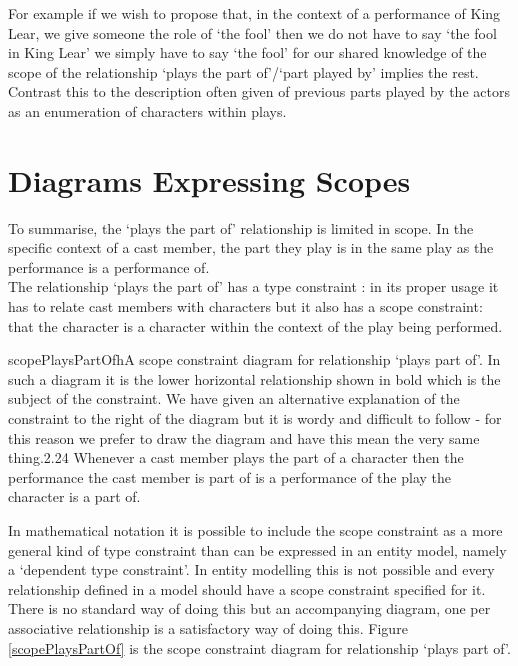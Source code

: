 \noindent For example if we wish to propose that, in the context of a performance of King Lear, we  give someone the role of `the fool' then we do not have to say `the fool in King Lear' we simply have to say `the fool' for our shared knowledge of the scope of the relationship `plays the part of'/`part played by' implies the rest. Contrast this to the description often given of previous parts played by the actors as an enumeration of characters within plays.\\

\section{Diagrams Expressing Scopes}
\noindent To summarise, the `plays the part of' relationship is limited in scope. In the specific context of a cast member, the part they play is in the same play as the performance is a performance of. \\

\noindent The relationship `plays the part of' has a type constraint : in its proper usage it has to relate cast members with characters but it also has a scope constraint: that the character is a character within the context of the play being performed.\\

\begin{ernotedDimFig}{scopePlaysPartOf}{h}{A scope constraint diagram for relationship `plays part of'. In such a diagram it is the lower horizontal relationship shown in bold which is the subject of the constraint. 
We have given an alternative explanation of the constraint to the right of the diagram but it is wordy and difficult to follow - for this reason we prefer to draw the diagram and have this mean the very same thing.}{2.2}{4}
Whenever a cast member plays the part of a character then the performance the cast member is part of is a performance of the play the character is a part of.
\end{ernotedDimFig} 

\noindent In mathematical notation it is possible to include the scope constraint as a more general kind of type constraint than can be expressed in an entity model, namely a `dependent type constraint'. In entity modelling this is not possible and every relationship defined in a model should have a scope constraint specified for it. There is no standard way of doing this but an accompanying diagram, one per associative relationship is a satisfactory way of doing this. Figure \ref{scopePlaysPartOf} is the scope constraint diagram for relationship `plays part of'.  \\

